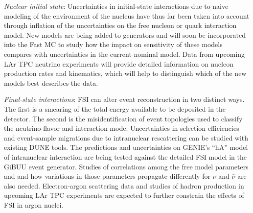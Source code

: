   \emph{Nuclear initial state}: Uncertainties in initial-state interactions due to
  naive modeling of the environment of the nucleus have thus far been taken into account through inflation
  of the uncertainties on the free nucleon or quark interaction
  model. New models are being added to generators and will soon be incorporated into the Fast MC
  to study how the impact on sensitivity of these models compares with uncertainties in the current nominal model.
  Data from upcoming LAr TPC neutrino experiments will provide detailed information on nucleon production
  rates and kinematics, which will help to distinguish which of the new models best describes the data.

  \emph{Final-state interactions}: FSI can alter event reconstruction in two distinct ways. The first is a smearing
  of the total energy available to be deposited in the detector. The second is the misidentification of
  event topologies used to classify the neutrino flavor and interaction mode. Uncertainties in selection
  efficiencies and event-sample migrations
  due to intranuclear rescattering can be studied with existing DUNE tools. The predictions and
  uncertainties on GENIE's ``hA'' model of intranuclear interaction
  are being tested against the detailed FSI model in the GiBUU event
  generator. Studies of correlations among the free model parameters and and how variations in those
  parameters propagate differently for $\nu$ and $\bar{\nu}$ are also needed. 
  Electron-argon scattering data and studies of hadron production
  in upcoming LAr TPC experiments are expected to further constrain the effects of FSI in argon nuclei.

